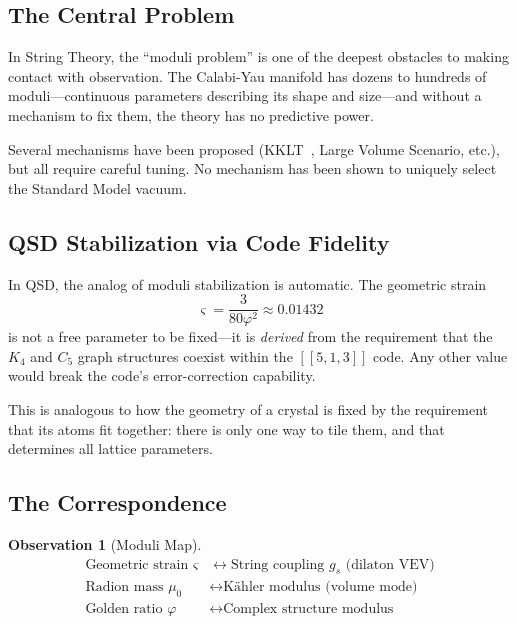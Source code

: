 \documentclass[11pt,a4paper]{article}
\theoremstyle{definition}
\newtheorem{observation}[theorem]{Observation}
\newcommand{\strain}{\varsigma}            %
\newcommand{\gr}{\varphi}
\newcommand{\murad}{\mu_0}
\newcommand{\gs}{g_s}
\begin{document}
\subsection{The Central Problem}

In String Theory, the ``moduli problem'' is one of the deepest obstacles
to making contact with observation.  The Calabi-Yau manifold has dozens to
hundreds of moduli---continuous parameters describing its shape and
size---and without a mechanism to fix them, the theory has no predictive
power.

Several mechanisms have been proposed (KKLT~\cite{KKLT2003}, Large Volume Scenario, etc.),
but all require careful tuning.  No mechanism has been shown to uniquely
select the Standard Model vacuum.

\subsection{QSD Stabilization via Code Fidelity}

In QSD, the analog of moduli stabilization is automatic.  The geometric
strain
\begin{equation}
\strain = \frac{3}{80\gr^2} \approx 0.01432
\end{equation}
is not a free parameter to be fixed---it is \emph{derived} from the
requirement that the $K_4$ and $C_5$ graph structures coexist within the
$[[5,1,3]]$ code.  Any other value would break the code's error-correction
capability.

This is analogous to how the geometry of a crystal is fixed by the
requirement that its atoms fit together: there is only one way to tile
them, and that determines all lattice parameters.

\subsection{The Correspondence}

\begin{observation}[Moduli Map]
\label{obs:moduli}
\begin{align}
\text{Geometric strain } \strain &\longleftrightarrow \text{String coupling } \gs
    \text{ (dilaton VEV)} \\
\text{Radion mass } \murad &\longleftrightarrow \text{K\"ahler modulus (volume mode)} \\
\text{Golden ratio } \gr &\longleftrightarrow \text{Complex structure modulus}
\end{align}
\end{observation}
\end{document}
